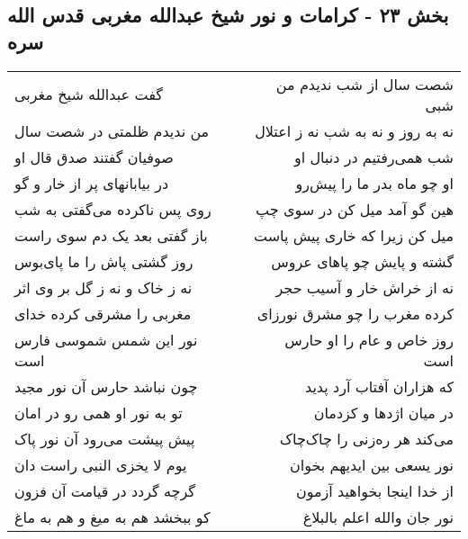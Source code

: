 \begin{center}
\section*{بخش ۲۳ - کرامات و نور شیخ عبدالله مغربی قدس الله سره}
\label{sec:sh023}
\begin{longtable}{l p{0.5cm} r}
گفت عبدالله شیخ مغربی
&&
شصت سال از شب ندیدم من شبی
\\
من ندیدم ظلمتی در شصت سال
&&
نه به روز و نه به شب نه ز اعتلال
\\
صوفیان گفتند صدق قال او
&&
شب همی‌رفتیم در دنبال او
\\
در بیابانهای پر از خار و گو
&&
او چو ماه بدر ما را پیش‌رو
\\
روی پس ناکرده می‌گفتی به شب
&&
هین گو آمد میل کن در سوی چپ
\\
باز گفتی بعد یک دم سوی راست
&&
میل کن زیرا که خاری پیش پاست
\\
روز گشتی پاش را ما پای‌بوس
&&
گشته و پایش چو پاهای عروس
\\
نه ز خاک و نه ز گل بر وی اثر
&&
نه از خراش خار و آسیب حجر
\\
مغربی را مشرقی کرده خدای
&&
کرده مغرب را چو مشرق نورزای
\\
نور این شمس شموسی فارس است
&&
روز خاص و عام را او حارس است
\\
چون نباشد حارس آن نور مجید
&&
که هزاران آفتاب آرد پدید
\\
تو به نور او همی رو در امان
&&
در میان اژدها و کزدمان
\\
پیش پیشت می‌رود آن نور پاک
&&
می‌کند هر ره‌زنی را چاک‌چاک
\\
یوم لا یخزی النبی راست دان
&&
نور یسعی بین ایدیهم بخوان
\\
گرچه گردد در قیامت آن فزون
&&
از خدا اینجا بخواهید آزمون
\\
کو ببخشد هم به میغ و هم به ماغ
&&
نور جان والله اعلم بالبلاغ
\\
\end{longtable}
\end{center}
